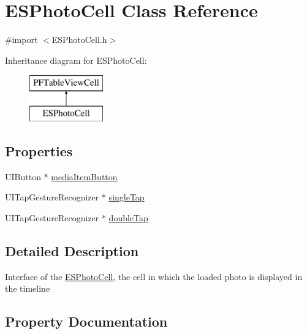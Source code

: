 \hypertarget{interface_e_s_photo_cell}{}\section{E\+S\+Photo\+Cell Class Reference}
\label{interface_e_s_photo_cell}


{\ttfamily \#import $<$E\+S\+Photo\+Cell.\+h$>$}

Inheritance diagram for E\+S\+Photo\+Cell\+:\begin{figure}[H]
\begin{center}
\leavevmode
\includegraphics[height=2.000000cm]{interface_e_s_photo_cell}
\end{center}
\end{figure}
\subsection*{Properties}
\begin{DoxyCompactItemize}
\item 
U\+I\+Button $\ast$ \hyperlink{interface_e_s_photo_cell_aeb1fe210b180b5d56627c1f6095a0921}{media\+Item\+Button}
\item 
U\+I\+Tap\+Gesture\+Recognizer $\ast$ \hyperlink{interface_e_s_photo_cell_a3d8dca4e8928cb7a2946551acd78c012}{single\+Tap}
\item 
U\+I\+Tap\+Gesture\+Recognizer $\ast$ \hyperlink{interface_e_s_photo_cell_a1d78b3d39f20fd1ce7ff9deaf2c3a168}{double\+Tap}
\end{DoxyCompactItemize}


\subsection{Detailed Description}
Interface of the \hyperlink{interface_e_s_photo_cell}{E\+S\+Photo\+Cell}, the cell in which the loaded photo is displayed in the timeline 

\subsection{Property Documentation}
\hypertarget{interface_e_s_photo_cell_a1d78b3d39f20fd1ce7ff9deaf2c3a168}{}
